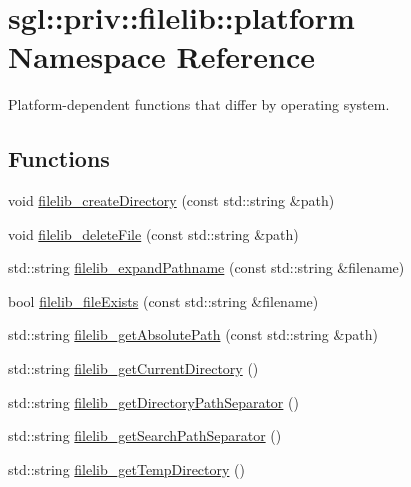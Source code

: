 \hypertarget{namespacesgl_1_1priv_1_1filelib_1_1platform}{}\section{sgl\+:\+:priv\+:\+:filelib\+:\+:platform Namespace Reference}
\label{namespacesgl_1_1priv_1_1filelib_1_1platform}


Platform-\/dependent functions that differ by operating system.  


\subsection*{Functions}
\begin{DoxyCompactItemize}
\item 
void \mbox{\hyperlink{namespacesgl_1_1priv_1_1filelib_1_1platform_aa30655cd42c277a7c5ed7aba21cf0050}{filelib\+\_\+create\+Directory}} (const std\+::string \&path)
\item 
void \mbox{\hyperlink{namespacesgl_1_1priv_1_1filelib_1_1platform_a50db655854102498e7bbc1d5f409a29f}{filelib\+\_\+delete\+File}} (const std\+::string \&path)
\item 
std\+::string \mbox{\hyperlink{namespacesgl_1_1priv_1_1filelib_1_1platform_a7aec69b6d9120eefca74eeba8f7eb02d}{filelib\+\_\+expand\+Pathname}} (const std\+::string \&filename)
\item 
bool \mbox{\hyperlink{namespacesgl_1_1priv_1_1filelib_1_1platform_a7ac56ce70edb176e3d75d83732517d85}{filelib\+\_\+file\+Exists}} (const std\+::string \&filename)
\item 
std\+::string \mbox{\hyperlink{namespacesgl_1_1priv_1_1filelib_1_1platform_acbd0e6215f4690ad235ec00ee8fc82e2}{filelib\+\_\+get\+Absolute\+Path}} (const std\+::string \&path)
\item 
std\+::string \mbox{\hyperlink{namespacesgl_1_1priv_1_1filelib_1_1platform_a52fd33354355f61a96ea88ac33aaa11a}{filelib\+\_\+get\+Current\+Directory}} ()
\item 
std\+::string \mbox{\hyperlink{namespacesgl_1_1priv_1_1filelib_1_1platform_abf9418d14665b0404fd9a942cd890151}{filelib\+\_\+get\+Directory\+Path\+Separator}} ()
\item 
std\+::string \mbox{\hyperlink{namespacesgl_1_1priv_1_1filelib_1_1platform_a9641200cba6781202640c6b723341af2}{filelib\+\_\+get\+Search\+Path\+Separator}} ()
\item 
std\+::string \mbox{\hyperlink{namespacesgl_1_1priv_1_1filelib_1_1platform_a969c5e3fc13cd635656eba2845bc932e}{filelib\+\_\+get\+Temp\+Directory}} ()

\end{DoxyCompactItemize}
